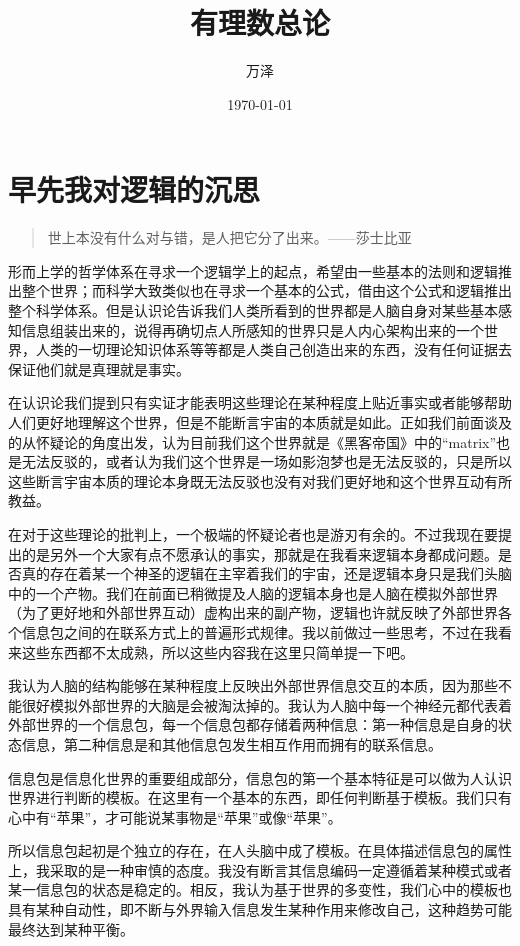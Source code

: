 \documentclass[11pt,oneside]{article}
\author{万泽}
\date{\today}
\title{有理数总论}
\begin{document}
\maketitle
\tableofcontents



\section{早先我对逻辑的沉思}
\label{sec-1}
\begin{quote}
世上本没有什么对与错，是人把它分了出来。——莎士比亚
\end{quote}

形而上学的哲学体系在寻求一个逻辑学上的起点，希望由一些基本的法则和逻辑推出整个世界；而科学大致类似也在寻求一个基本的公式，借由这个公式和逻辑推出整个科学体系。但是认识论告诉我们人类所看到的世界都是人脑自身对某些基本感知信息组装出来的，说得再确切点人所感知的世界只是人内心架构出来的一个世界，人类的一切理论知识体系等等都是人类自己创造出来的东西，没有任何证据去保证他们就是真理就是事实。

在认识论我们提到只有实证才能表明这些理论在某种程度上贴近事实或者能够帮助人们更好地理解这个世界，但是不能断言宇宙的本质就是如此。正如我们前面谈及的从怀疑论的角度出发，认为目前我们这个世界就是《黑客帝国》中的“matrix”也是无法反驳的，或者认为我们这个世界是一场如影泡梦也是无法反驳的，只是所以这些断言宇宙本质的理论本身既无法反驳也没有对我们更好地和这个世界互动有所教益。

在对于这些理论的批判上，一个极端的怀疑论者也是游刃有余的。不过我现在要提出的是另外一个大家有点不愿承认的事实，那就是在我看来逻辑本身都成问题。是否真的存在着某一个神圣的逻辑在主宰着我们的宇宙，还是逻辑本身只是我们头脑中的一个产物。我们在前面已稍微提及人脑的逻辑本身也是人脑在模拟外部世界（为了更好地和外部世界互动）虚构出来的副产物，逻辑也许就反映了外部世界各个信息包之间的在联系方式上的普遍形式规律。我以前做过一些思考，不过在我看来这些东西都不太成熟，所以这些内容我在这里只简单提一下吧。

我认为人脑的结构能够在某种程度上反映出外部世界信息交互的本质，因为那些不能很好模拟外部世界的大脑是会被淘汰掉的。我认为人脑中每一个神经元都代表着外部世界的一个信息包，每一个信息包都存储着两种信息：第一种信息是自身的状态信息，第二种信息是和其他信息包发生相互作用而拥有的联系信息。

信息包是信息化世界的重要组成部分，信息包的第一个基本特征是可以做为人认识世界进行判断的模板。在这里有一个基本的东西，即任何判断基于模板。我们只有心中有“苹果”，才可能说某事物是“苹果”或像“苹果”。

所以信息包起初是个独立的存在，在人头脑中成了模板。在具体描述信息包的属性上，我采取的是一种审慎的态度。我没有断言其信息编码一定遵循着某种模式或者某一信息包的状态是稳定的。相反，我认为基于世界的多变性，我们心中的模板也具有某种自动性，即不断与外界输入信息发生某种作用来修改自己，这种趋势可能最终达到某种平衡。
\end{document}
